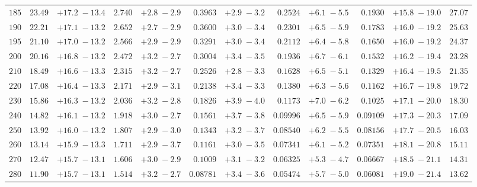 \begin{landscape}
\begin{table}
\begin{center}
\begin{tabular}{r|rc|rc|rc|rc|rc|r}
 $ 185$ & $  23.49$ & $ +17.2 \; -\!13.4$ & $  2.740$ & $ +2.8 \; -\!2.9$ & $ 0.3963$ & $ +2.9 \; -\!3.2$ & $ 0.2524$ & $ +6.1 \; -\!5.5$ & $  0.1930$ & $ +15.8 \; -\!19.0$ & $     27.07$ \\ 
 $ 190$ & $  22.21$ & $ +17.1 \; -\!13.2$ & $  2.652$ & $ +2.7 \; -\!2.9$ & $ 0.3600$ & $ +3.0 \; -\!3.4$ & $ 0.2301$ & $ +6.5 \; -\!5.9$ & $  0.1783$ & $ +16.0 \; -\!19.2$ & $     25.63$ \\ 
 $ 195$ & $  21.10$ & $ +17.0 \; -\!13.2$ & $  2.566$ & $ +2.9 \; -\!2.9$ & $ 0.3291$ & $ +3.0 \; -\!3.4$ & $ 0.2112$ & $ +6.4 \; -\!5.8$ & $  0.1650$ & $ +16.0 \; -\!19.2$ & $     24.37$ \\ 
 $ 200$ & $  20.16$ & $ +16.8 \; -\!13.2$ & $  2.472$ & $ +3.2 \; -\!2.7$ & $ 0.3004$ & $ +3.4 \; -\!3.5$ & $ 0.1936$ & $ +6.7 \; -\!6.1$ & $  0.1532$ & $ +16.2 \; -\!19.4$ & $     23.28$ \\ 
 $ 210$ & $  18.49$ & $ +16.6 \; -\!13.3$ & $  2.315$ & $ +3.2 \; -\!2.7$ & $ 0.2526$ & $ +2.8 \; -\!3.3$ & $ 0.1628$ & $ +6.5 \; -\!5.1$ & $  0.1329$ & $ +16.4 \; -\!19.5$ & $     21.35$ \\ 
 $ 220$ & $  17.08$ & $ +16.4 \; -\!13.3$ & $  2.171$ & $ +2.9 \; -\!3.1$ & $ 0.2138$ & $ +3.4 \; -\!3.3$ & $ 0.1380$ & $ +6.3 \; -\!5.6$ & $  0.1162$ & $ +16.7 \; -\!19.8$ & $     19.72$ \\ 
 $ 230$ & $  15.86$ & $ +16.3 \; -\!13.2$ & $  2.036$ & $ +3.2 \; -\!2.8$ & $ 0.1826$ & $ +3.9 \; -\!4.0$ & $ 0.1173$ & $ +7.0 \; -\!6.2$ & $  0.1025$ & $ +17.1 \; -\!20.0$ & $     18.30$ \\ 
 $ 240$ & $  14.82$ & $ +16.1 \; -\!13.2$ & $  1.918$ & $ +3.0 \; -\!2.7$ & $ 0.1561$ & $ +3.7 \; -\!3.8$ & $0.09996$ & $ +6.5 \; -\!5.9$ & $ 0.09109$ & $ +17.3 \; -\!20.3$ & $     17.09$ \\ 
 $ 250$ & $  13.92$ & $ +16.0 \; -\!13.2$ & $  1.807$ & $ +2.9 \; -\!3.0$ & $ 0.1343$ & $ +3.2 \; -\!3.7$ & $0.08540$ & $ +6.2 \; -\!5.5$ & $ 0.08156$ & $ +17.7 \; -\!20.5$ & $     16.03$ \\ 
 $ 260$ & $  13.14$ & $ +15.9 \; -\!13.3$ & $  1.711$ & $ +2.9 \; -\!3.7$ & $ 0.1161$ & $ +3.0 \; -\!3.5$ & $0.07341$ & $ +6.1 \; -\!5.2$ & $ 0.07351$ & $ +18.1 \; -\!20.8$ & $     15.11$ \\ 
 $ 270$ & $  12.47$ & $ +15.7 \; -\!13.1$ & $  1.606$ & $ +3.0 \; -\!2.9$ & $ 0.1009$ & $ +3.1 \; -\!3.2$ & $0.06325$ & $ +5.3 \; -\!4.7$ & $ 0.06667$ & $ +18.5 \; -\!21.1$ & $     14.31$ \\ 
 $ 280$ & $  11.90$ & $ +15.7 \; -\!13.1$ & $  1.514$ & $ +3.2 \; -\!2.7$ & $0.08781$ & $ +3.4 \; -\!3.6$ & $0.05474$ & $ +5.7 \; -\!5.0$ & $ 0.06081$ & $ +19.0 \; -\!21.4$ & $     13.62$ \\ 

\end{tabular}
\end{center}
\end{table}
\end{landscape}
